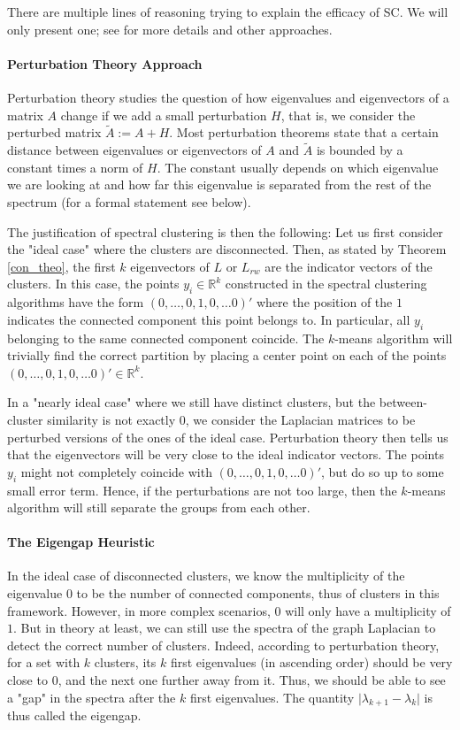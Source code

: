 \documentclass[a4paper,12pt]{article}
\theoremstyle{definition}
\theoremstyle{plain}
\def\R{\mathbb{R}}%
\begin{document}
There are multiple lines of reasoning trying to explain the efficacy of SC. We will only present one; see \cite{tutorial} for more details and other approaches.

\paragraph{Perturbation Theory Approach}
Perturbation theory studies the question of how eigenvalues and eigenvectors of a matrix $A$ change if we add a small perturbation $H$, that is, we consider the perturbed matrix $\tilde A := A + H$. Most perturbation theorems state that a certain distance between eigenvalues or eigenvectors of $A$ and $\tilde A$ is bounded by a constant times a norm of $H$. The constant usually depends on which eigenvalue we are looking at and how far this eigenvalue is separated from the rest of the spectrum (for a formal statement see below). 

The justification of spectral clustering is then the following: Let us first consider the "ideal case" where the clusters are disconnected. Then, as stated by Theorem \ref{con_theo}, the first $k$ eigenvectors of $L$ or $L_{rw}$ are the indicator vectors of the clusters. In this case, the points $y_i \in \R^k$ constructed in the spectral clustering algorithms have the form $(0,\hdots,0,1,0,\hdots0)'$ where the position of the $1$ indicates the connected component this point belongs to. In particular, all $y_i$ belonging to the same connected component coincide. The $k$-means algorithm will trivially find the correct partition by placing a center point on each of the points $(0,\hdots,0,1,0,\hdots0)' \in \R^k$.

In a "nearly ideal case" where we still have distinct clusters, but the between-cluster similarity is not exactly 0, we consider the Laplacian matrices to be perturbed versions of the ones of the ideal case. Perturbation theory then tells us that the eigenvectors will be very close to the ideal indicator vectors. The points $y_i$ might not completely coincide with $(0,\hdots,0,1,0,\hdots0)'$, but do so up to some small error term. Hence, if the perturbations are not too large, then the $k$-means algorithm will still separate the groups from each other.


\paragraph{The Eigengap Heuristic}
In the ideal case of disconnected clusters, we know the multiplicity of the eigenvalue $0$ to be the number of connected components, thus of clusters in this framework. However, in more complex scenarios, $0$ will only have a multiplicity of $1$. But in theory at least, we can still use the spectra of the graph Laplacian to detect the correct number of clusters. Indeed, according to perturbation theory, for a set with $k$ clusters, its $k$ first eigenvalues (in ascending order) should be very close to $0$, and the next one further away from it. Thus, we should be able to see a "gap" in the spectra after the $k$ first eigenvalues. The quantity $\lvert \lambda_{k+1} - \lambda_k \rvert$ is thus called the eigengap.
\end{document}
